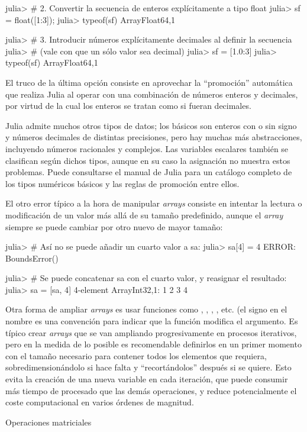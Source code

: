 ﻿\documentclass[spanish]{article}
\begin{document}
julia> \# 2. Convertir la secuencia de enteros explícitamente a tipo float
julia> sf = float({[}1:3{]});
julia> typeof(sf)
Array{Float64,1}

julia> \# 3. Introducir números explícitamente decimales al definir la secuencia
julia> \# (vale con que un sólo valor sea decimal)
julia> sf = {[}1.0:3{]}
julia> typeof(sf)
Array{Float64,1}

El truco de la última opción consiste en aprovechar la ``promoción''
automática que realiza Julia al operar con una combinación de números
enteros y decimales, por virtud de la cual los enteros se tratan como
si fueran decimales.

Julia admite muchos otros tipos de datos; los básicos son enteros
con o sin signo y números decimales de distintas precisiones, pero
hay muchas más abstracciones, incluyendo números racionales y complejos.
Las variables escalares también se clasifican según dichos tipos,
aunque en su caso la asignación no muestra estos problemas. Puede
consultarse el manual de Julia para un catálogo completo de los tipos
numéricos básicos y las reglas de promoción entre ellos.

El otro error típico a la hora de manipular \emph{arrays} consiste
en intentar la lectura o modificación de un valor más allá de su tamaño
predefinido, aunque el \emph{array} siempre se puede cambiar por otro
nuevo de mayor tamaño:

julia> \# Así no se puede añadir un cuarto valor a sa:
julia> sa{[}4{]} = 4
ERROR: BoundsError()

julia> \# Se puede concatenar sa con el cuarto valor, y reasignar el resultado:
julia> sa = {[}sa, 4{]}
4-element Array{Int32,1}:
 1 2 3 4

Otra forma de ampliar \emph{arrays} es usar funciones como ,
, , , etc. (el signo
\code{!} en el nombre es una convención para indicar que la función
modifica el argumento. Es típico crear \emph{arrays} que se van ampliando
progresivamente en procesos iterativos, pero en la medida de lo posible
es recomendable definirlos en un primer momento con el tamaño necesario
para contener todos los elementos que requiera, sobredimensionándolo
si hace falta y ``recortándolos'' después si se quiere. Esto evita
la creación de una nueva variable en cada iteración, que puede consumir
más tiempo de procesado que las demás operaciones, y reduce potencialmente
el coste computacional en varios órdenes de magnitud.

Operaciones matriciales
\end{document}
